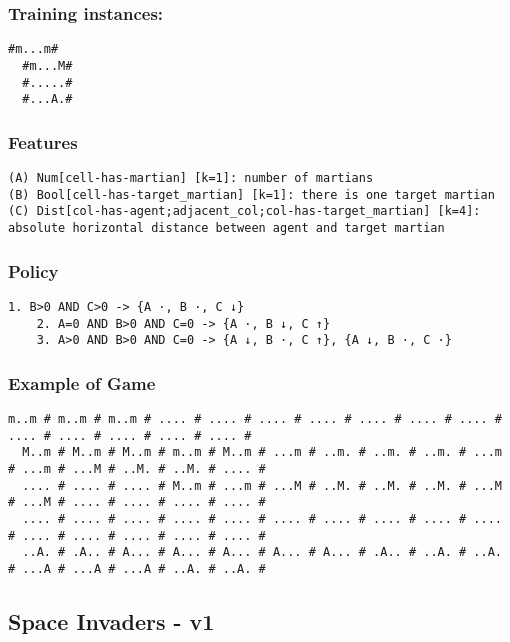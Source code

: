 \documentclass[a4paper]{article}
\begin{document}
\subsubsection{Training instances:}
\begin{Verbatim}[fontsize=\footnotesize]
  #m...m#
  #m...M#
  #.....#
  #...A.#
\end{Verbatim}

\subsubsection{Features}
\begin{Verbatim}[fontsize=\footnotesize]
(A) Num[cell-has-martian] [k=1]: number of martians
(B) Bool[cell-has-target_martian] [k=1]: there is one target martian
(C) Dist[col-has-agent;adjacent_col;col-has-target_martian] [k=4]: absolute horizontal distance between agent and target martian
\end{Verbatim}

\subsubsection{Policy}
\begin{Verbatim}[fontsize=\footnotesize]
    1. B>0 AND C>0 -> {A ·, B ·, C ↓}
    2. A=0 AND B>0 AND C=0 -> {A ·, B ↓, C ↑}
    3. A>0 AND B>0 AND C=0 -> {A ↓, B ·, C ↑}, {A ↓, B ·, C ·}
\end{Verbatim}

\subsubsection{Example of Game}
\begin{Verbatim}[fontsize=\footnotesize]
  m..m # m..m # m..m # .... # .... # .... # .... # .... # .... # .... # .... # .... # .... # .... # .... #
  M..m # M..m # M..m # m..m # M..m # ...m # ..m. # ..m. # ..m. # ...m # ...m # ...M # ..M. # ..M. # .... #
  .... # .... # .... # M..m # ...m # ...M # ..M. # ..M. # ..M. # ...M # ...M # .... # .... # .... # .... #
  .... # .... # .... # .... # .... # .... # .... # .... # .... # .... # .... # .... # .... # .... # .... #
  ..A. # .A.. # A... # A... # A... # A... # A... # .A.. # ..A. # ..A. # ...A # ...A # ...A # ..A. # ..A. #
\end{Verbatim}

\subsection{Space Invaders - v1}
\end{document}
